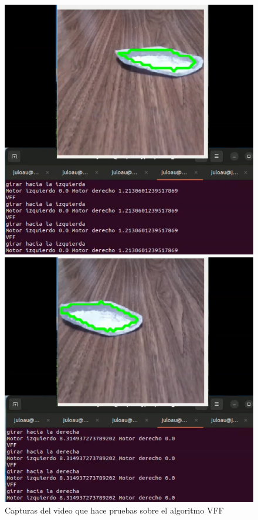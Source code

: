  
\begin{figure} [h!]
	\centering
	\begin{minipage}{0.45\linewidth}
		\centering
		\includegraphics[width=\linewidth]{figs/cap7/demovff1.png}
	\end{minipage}
	\hspace{1cm}
	\begin{minipage}{0.45\linewidth}
		\centering
		\includegraphics[width=\linewidth]{figs/cap7/demovff2.png}
	\end{minipage}
	\caption{Capturas del video que hace pruebas sobre el algoritmo VFF}
	\label{fig:expvff}
\end{figure}


